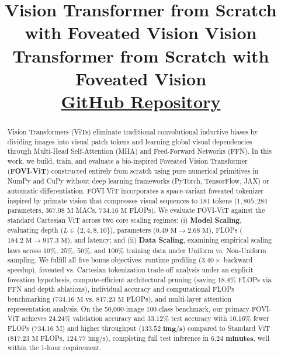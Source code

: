 \documentclass[10pt,conference]{IEEEtran}
\begin{document}
\title{Vision Transformer from Scratch with Foveated Vision }

\author{
}

\title{
    Vision Transformer from Scratch with Foveated Vision\\[0.3em]
    \large \href{https://github.com/Deepakmewadaa/GNR-650.git}{GitHub Repository}
}

\maketitle

\begin{abstract}
Vision Transformers (ViTs) eliminate traditional convolutional inductive biases by dividing images into visual patch tokens and learning global visual dependencies through Multi-Head Self-Attention (MHA) and Feed-Forward Networks (FFN). In this work, we build, train, and evaluate a bio-inspired Foveated Vision Transformer (\textbf{FOVI-ViT}) constructed entirely from scratch using pure numerical primitives in NumPy and CuPy without deep learning frameworks (PyTorch, TensorFlow, JAX) or automatic differentiation. FOVI-ViT incorporates a space-variant foveated tokenizer inspired by primate vision that compresses visual sequences to 181 tokens ($1,805,284$ parameters, $367.08\text{ M}$ MACs, $734.16\text{ M}$ FLOPs). We evaluate FOVI-ViT against the standard Cartesian ViT across two core scaling regimes: (i) \textbf{Model Scaling}, evaluating depth ($L \in \{2, 4, 8, 10\}$), parameters ($0.49\text{ M} \to 2.68\text{ M}$), FLOPs ($184.2\text{ M} \to 917.3\text{ M}$), and latency; and (ii) \textbf{Data Scaling}, examining empirical scaling laws across $10\%$, $25\%$, $50\%$, and $100\%$ training data under Uniform vs. Non-Uniform sampling. We fulfill all five bonus objectives: runtime profiling ($3.40\times$ backward speedup), foveated vs. Cartesian tokenization trade-off analysis under an explicit foveation hypothesis, compute-efficient architectural pruning (saving $18.4\%$ FLOPs via FFN and depth ablations), individual accuracy and computational FLOPs benchmarking ($734.16\text{ M}$ vs. $817.23\text{ M}$ FLOPs), and multi-layer attention representation analysis. On the 50,000-image 100-class benchmark, our primary FOVI-ViT achieves $\mathbf{24.24\%}$ validation accuracy and $\mathbf{33.12\%}$ test accuracy with $10.16\%$ fewer FLOPs ($734.16\text{ M}$) and higher throughput ($\mathbf{133.52\text{ img/s}}$) compared to Standard ViT ($817.23\text{ M}$ FLOPs, $124.77\text{ img/s}$), completing full test inference in $\mathbf{6.24\text{ minutes}}$, well within the 1-hour requirement.
\end{abstract}
\end{document}
